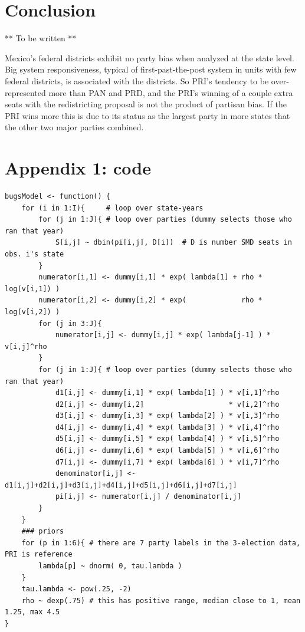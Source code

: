 \documentclass[letter,12pt]{article}
\begin{document}


\section{Conclusion}

** To be written **

Mexico's federal districts exhibit no party bias when analyzed at the state level. Big system responsiveness, typical of first-past-the-post system in units with few federal districts, is associated with the districts. So PRI's tendency to be over-represented more than PAN and PRD, and the PRI's winning of a couple extra seats with the redistricting proposal is not the product of partisan bias. If the PRI wins more this is due to its status as the largest party in more states that the other two major parties combined. 

\section*{Appendix 1: code}

\begin{footnotesize}
\begin{verbatim}
bugsModel <- function() {
    for (i in 1:I){     # loop over state-years
        for (j in 1:J){ # loop over parties (dummy selects those who ran that year) 
            S[i,j] ~ dbin(pi[i,j], D[i])  # D is number SMD seats in obs. i's state
        }
        numerator[i,1] <- dummy[i,1] * exp( lambda[1] + rho * log(v[i,1]) )
        numerator[i,2] <- dummy[i,2] * exp(             rho * log(v[i,2]) )
        for (j in 3:J){
            numerator[i,j] <- dummy[i,j] * exp( lambda[j-1] ) * v[i,j]^rho
        }
        for (j in 1:J){ # loop over parties (dummy selects those who ran that year) 
            d1[i,j] <- dummy[i,1] * exp( lambda[1] ) * v[i,1]^rho 
            d2[i,j] <- dummy[i,2]                    * v[i,2]^rho 
            d3[i,j] <- dummy[i,3] * exp( lambda[2] ) * v[i,3]^rho 
            d4[i,j] <- dummy[i,4] * exp( lambda[3] ) * v[i,4]^rho 
            d5[i,j] <- dummy[i,5] * exp( lambda[4] ) * v[i,5]^rho 
            d6[i,j] <- dummy[i,6] * exp( lambda[5] ) * v[i,6]^rho 
            d7[i,j] <- dummy[i,7] * exp( lambda[6] ) * v[i,7]^rho 
            denominator[i,j] <- d1[i,j]+d2[i,j]+d3[i,j]+d4[i,j]+d5[i,j]+d6[i,j]+d7[i,j]
            pi[i,j] <- numerator[i,j] / denominator[i,j]
        }
    }
    ### priors
    for (p in 1:6){ # there are 7 party labels in the 3-election data, PRI is reference
        lambda[p] ~ dnorm( 0, tau.lambda )
    }
    tau.lambda <- pow(.25, -2)
    rho ~ dexp(.75) # this has positive range, median close to 1, mean 1.25, max 4.5
}
\end{verbatim}
\end{footnotesize}
\end{document}
